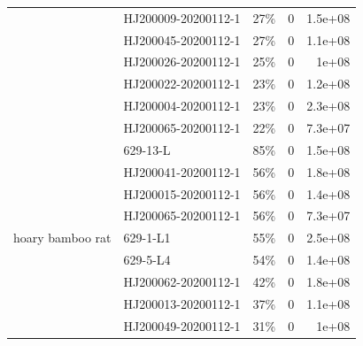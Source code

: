 \documentclass[9pt,twocolumn,twoside]{gsajnl_modified}
\begin{document}
\begin{table}
{\begin{tabular}{llrrr}
                  & HJ200009-20200112-1 &                                       27\% &                        0 &                   1.5e+08 \\
                  & HJ200045-20200112-1 &                                       27\% &                        0 &                   1.1e+08 \\
                  & HJ200026-20200112-1 &                                       25\% &                        0 &                     1e+08 \\
                  & HJ200022-20200112-1 &                                       23\% &                        0 &                   1.2e+08 \\
                  & HJ200004-20200112-1 &                                       23\% &                        0 &                   2.3e+08 \\
                  & HJ200065-20200112-1 &                                       22\% &                        0 &                   7.3e+07 \\
\cline{1-5}
\multirow{14}{*}{hoary bamboo rat} & 629-13-L &                                       85\% &                        0 &                   1.5e+08 \\
                  & HJ200041-20200112-1 &                                       56\% &                        0 &                   1.8e+08 \\
                  & HJ200015-20200112-1 &                                       56\% &                        0 &                   1.4e+08 \\
                  & HJ200065-20200112-1 &                                       56\% &                        0 &                   7.3e+07 \\
                  & 629-1-L1 &                                       55\% &                        0 &                   2.5e+08 \\
                  & 629-5-L4 &                                       54\% &                        0 &                   1.4e+08 \\
                  & HJ200062-20200112-1 &                                       42\% &                        0 &                   1.8e+08 \\
                  & HJ200013-20200112-1 &                                       37\% &                        0 &                   1.1e+08 \\
                  & HJ200049-20200112-1 &                                       31\% &                        0 &                     1e+08 \\

\end{tabular}}
\end{table}
\end{document}
